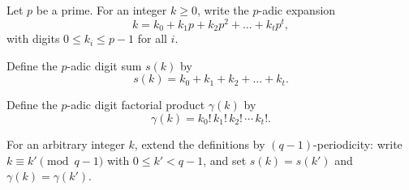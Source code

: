 Let $p$ be a prime. For an integer $k \geq 0$, write the $p$-adic expansion
$$k = k_0 + k_1 p + k_2 p^2 + \dots + k_t p^t,$$
with digits $0 \leq k_i \leq p-1$ for all $i$.

Define the $p$-adic digit sum $s(k)$ by
$$s(k) = k_0 + k_1 + k_2 + \dots + k_t.$$

Define the $p$-adic digit factorial product $\gamma(k)$ by
$$\gamma(k) = k_0! \, k_1! \, k_2! \, \cdots \, k_t!.$$

For an arbitrary integer $k$, extend the definitions by $(q-1)$-periodicity: write $k \equiv k' \pmod{q-1}$ with $0 \leq k' < q-1$, and set $s(k) = s(k')$ and $\gamma(k) = \gamma(k')$.
